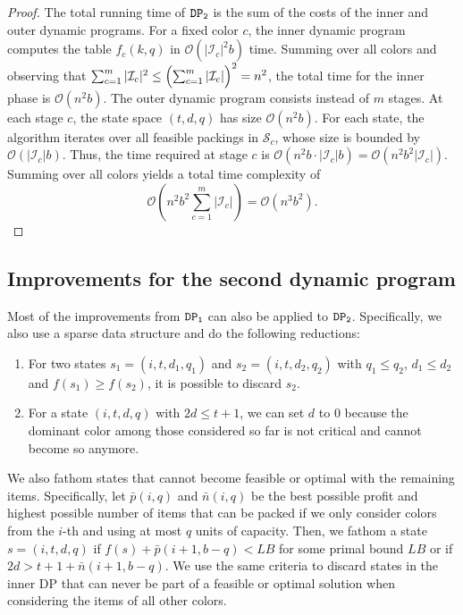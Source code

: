 \documentclass[preprint,11pt]{elsarticle}
\newcommand{\items}{\mathcal{I}}
\newcommand{\profit}{p}
\newcommand{\capacity}{b}
\newcommand{\firstDP}{{\tt DP_1}}
\newcommand{\secondDP}{{\tt DP_2}}
\theoremstyle{definition}
\begin{document}
\begin{proof}
\smallskip
The total running time of $\secondDP$ is the sum of the costs of the inner and outer dynamic programs. 
For a fixed color $c$, the inner dynamic program computes the table $f_c(k,q)$ in $\mathcal{O}(|\items_c|^2 \capacity)$ time. 
Summing over all colors and observing that $\sum_{c=1}^m |\items_c|^2 \le \Bigl(\sum_{c=1}^m |\items_c|\Bigr)^2 = n^2$, the total time for the inner phase is $\mathcal{O}(n^2 \capacity)$.
The outer dynamic program consists instead of $m$ stages. 
At each stage $c$, the state space $(t,d,q)$ has size $\mathcal{O}(n^2 \capacity)$. 
For each state, the algorithm iterates over all feasible packings in $\mathcal{S}_c$, whose size is bounded by $\mathcal{O}(|\items_c| \capacity)$. Thus, the time required at stage $c$ is $\mathcal{O}(n^2 \capacity \cdot |\items_c| \capacity) = \mathcal{O}(n^2 \capacity^2 |\items_c|)$.
Summing over all colors yields a total time complexity of
\begin{equation*}
    \mathcal{O}\left(n^2 \capacity^2 \sum_{c=1}^m |\items_c|\right)
= \mathcal{O}(n^3 \capacity^2).
\end{equation*}
\end{proof}


\subsection{Improvements for the second dynamic program}
Most of the improvements from $\firstDP$ can also be applied to $\secondDP$.
Specifically, we also use a sparse data structure and do the following reductions:
\begin{enumerate}
    \item[i)] For two states $s_1 = (i,t,d_1,q_1)$ and $s_2 = (i, t, d_2, q_2)$ with $q_1 \leq q_2$, $d_1 \leq d_2$ and $f(s_1) \geq f(s_2)$, it is possible to discard $s_2$.
    \item[ii)] For a state $(i,t,d,q)$ with $2d \leq t + 1$, we can set $d$ to $0$ because the dominant color among those considered so far is not critical and cannot become so anymore. 
\end{enumerate}

We also fathom states that cannot become feasible or optimal with the remaining items. 
Specifically, let $\bar{\profit}(i, q)$ and $\bar{n}(i,q)$ be the best possible profit and highest possible number of items that can be packed if we only consider colors from the $i$-th and using at most $q$ units of capacity. 
Then, we fathom a state $s = (i,t,d,q)$ if $f(s) + \bar{\profit}(i+1,\capacity-q) < LB$ for some primal bound $LB$ or if $2d > t + 1 + \bar{n}(i+1,\capacity-q)$.
We use the same criteria to discard states in the inner DP that can never be part of a feasible or optimal solution when considering the items of all other colors.
\end{document}
